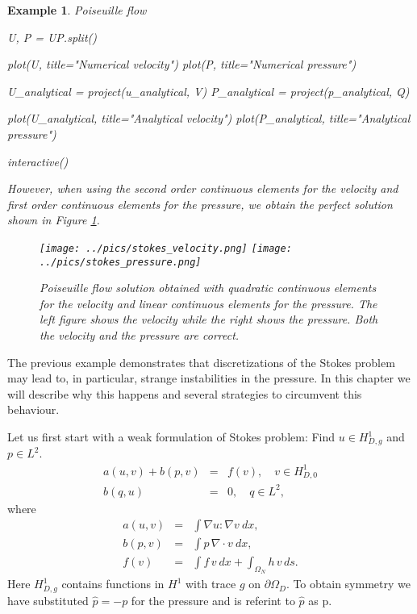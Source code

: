 \documentclass[a4paper,11pt]{amsart}
\newtheorem{example}{Example}[section]
\begin{document}
\begin{example}{Poiseuille flow}
\begin{python}
U, P = UP.split()

plot(U, title="Numerical velocity")
plot(P, title="Numerical pressure")

U_analytical = project(u_analytical, V)
P_analytical = project(p_analytical, Q)

plot(U_analytical, title="Analytical velocity")
plot(P_analytical, title="Analytical pressure")

interactive()
\end{python}



However, when using the second order continuous elements for the velocity and
first order continuous elements for the pressure, we obtain the perfect solution
shown in Figure \ref{fig:stokes2}.
\begin{figure}
\begin{center}
\texttt{[image: ../pics/stokes\_velocity.png]}
\texttt{[image: ../pics/stokes\_pressure.png]}
\caption{Poiseuille flow solution obtained with quadratic continuous elements for the
velocity and linear continuous elements for the pressure. The left figure shows the velocity while the right shows
the pressure. Both the velocity and the pressure are correct.}
\label{fig:stokes2}
\end{center}
\end{figure}
\end{example}

The previous example demonstrates that discretizations of the Stokes problem may lead
to, in particular, strange instabilities in the pressure. In this chapter we will describe why this
happens and several strategies to circumvent this behaviour.

Let us first start with a weak formulation of Stokes problem:
Find $u\in H^1_{D,g}$ and $p\in L^2$.
\begin{eqnarray*}
a(u,v) + b(p,v) &=& f(v), \quad v\in H_{D,0}^1\\
b(q,u) &=& 0,\quad q\in L^2,
\end{eqnarray*}
where
\begin{eqnarray*}
a(u,v) &=& \int\nabla u : \nabla v\ dx, \\
b(p,v) &=& \int p \, \nabla \cdot v\ dx, \\
f(v) &=& \int f\, v\ dx + \int_{\Omega_N} h \, v \, ds  .
\end{eqnarray*}
Here
$H^1_{D,g}$ contains functions  in $H^1$ with trace $g$ on $\partial \Omega_D$.
To obtain symmetry we have substituted $\hat{p} = - p$ for the pressure
and is referint to $\hat{p}$ as p.
\end{document}
